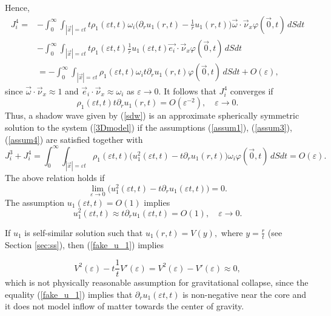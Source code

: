\documentclass[reqno]{article}%
\theoremstyle{plain}
\theoremstyle{definition}
\theoremstyle{remark}
\numberwithin{equation}{section}
\begin{document}
Hence,
\[\begin{split}
J_i^4=&-\int_0^\infty \int_{|\vec{x}|=\varepsilon t} t\rho_1(\varepsilon t,t)\omega_i\big(\partial_r u_1(r,t)-\frac{1}{r}u_1(r,t)\big)\vec{\omega}\cdot \vec{\nu}_x \varphi(\vec{0},t)\,dSdt\\
&- \int_0^\infty \int_{|\vec{x}|=\varepsilon t} t\rho_1(\varepsilon t,t)\frac{1}{r}u_1(\varepsilon t,t)\vec{e_i}\cdot \vec{\nu}_x\varphi(\vec{0},t)\,dSdt\\
&=-\int_0^\infty \int_{|\vec{x}|=\varepsilon t} \rho_1(\varepsilon t,t)\omega_i t\partial_r u_1(r,t) \varphi(\vec{0},t)\,dSdt+O(\varepsilon),
\end{split}
\]
since $\vec{\omega}\cdot \vec{\nu}_x\approx 1$ and $\vec{e}_i\cdot \vec{\nu}_x\approx \omega_i$ as $\varepsilon\to 0.$ It follows that $J_i^4$ converges if 
\begin{equation}\label{assum4}
\rho_1(\varepsilon t,t)t\partial_r u_1(r,t)=O(\varepsilon^{-2}),\quad \varepsilon\to 0.
\end{equation}
Thus, a shadow wave given by (\ref{sdw}) is an approximate spherically symmetric  solution to the system (\ref{3Dmodel}) if the assumptions (\ref{assum1}), (\ref{assum3}), (\ref{assum4}) are satisfied together with
\[J_i^3+J_i^4=\int_0^\infty \int_{|\vec{x}|=\varepsilon t} \rho_1(\varepsilon t,t)\big(u_1^2(\varepsilon t,t)-t\partial_r u_1(r,t)\big) \omega_i \varphi(\vec{0},t)\,dSdt=O(\varepsilon).\]
The above relation holds if 
\[\lim_{\varepsilon\to 0}\big(u_1^2(\varepsilon t,t)-t\partial_r u_1(\varepsilon t,t)\big)=0.\]
The assumption $u_1(\varepsilon t,t)=O(1)$  implies 
\begin{equation}\label{fake_u_1}
u_1^2(\varepsilon t,t)\approx t\partial_r u_1(\varepsilon t,t)=O(1),\quad \varepsilon\to 0.\end{equation}

If $u_1$ is self-similar solution such that $u_1(r,t)=V(y),$ where $y=\frac{r}{t}$ (see Section \ref{sec:ss}), then (\ref{fake_u_1}) implies

\[V^2(\varepsilon)-t\frac{1}{t}V'(\varepsilon)=V^2(\varepsilon)-V'(\varepsilon)\approx 0,\]
which is not physically reasonable assumption for gravitational collapse, since the equality (\ref{fake_u_1}) implies that  $\partial_r u_1(\varepsilon t,t)$ is non-negative near the core and it does not model inflow of matter towards the center of gravity. 
\end{document}
